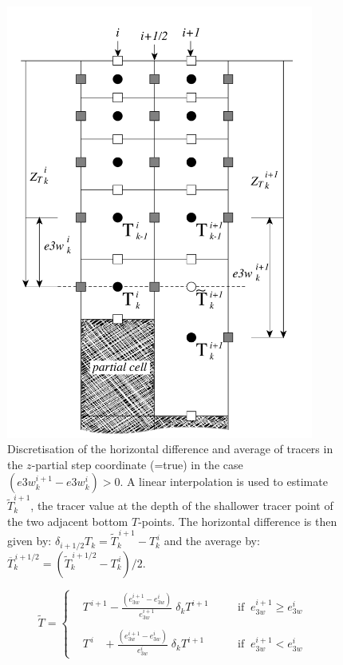 \begin{figure}[!p] 	 \begin{center}
\includegraphics[width=0.9\textwidth]{./TexFiles/Figures/Partial_step_scheme.pdf}
\caption{ 	\label{Fig_Partial_step_scheme} 
Discretisation of the horizontal difference and average of tracers in the $z$-partial 
step coordinate (=true) in the case $( e3w_k^{i+1} - e3w_k^i  )>0$. 
A linear interpolation is used to estimate $\widetilde{T}_k^{i+1}$, the tracer value 
at the depth of the shallower tracer point of the two adjacent bottom $T$-points. 
The horizontal difference is then given by: $\delta _{i+1/2} T_k=  \widetilde{T}_k^{\,i+1} -T_k^{\,i}$ 
and the average by: $\overline{T}_k^{\,i+1/2}= ( \widetilde{T}_k^{\,i+1/2} - T_k^{\,i} ) / 2$.  }
\end{center}   \end{figure}
\begin{equation*}
\widetilde{T}= \left\{  \begin{aligned}  
&T^{\,i+1}      -\frac{ \left( e_{3w}^{i+1} -e_{3w}^i \right)}{ e_{3w}^{i+1} }\;\delta _k T^{i+1}	
 								&& \quad\text{if  $\ e_{3w}^{i+1} \geq e_{3w}^i$   } 	\\
										\\
&T^{\,i} \ \ \ \,+\frac{ \left( e_{3w}^{i+1} -e_{3w}^i \right) }{e_{3w}^i       }\;\delta _k T^{i+1}
			 					&& \quad\text{if  $\ e_{3w}^{i+1}    <   e_{3w}^i$   } 
            \end{aligned}   \right.
\end{equation*}
